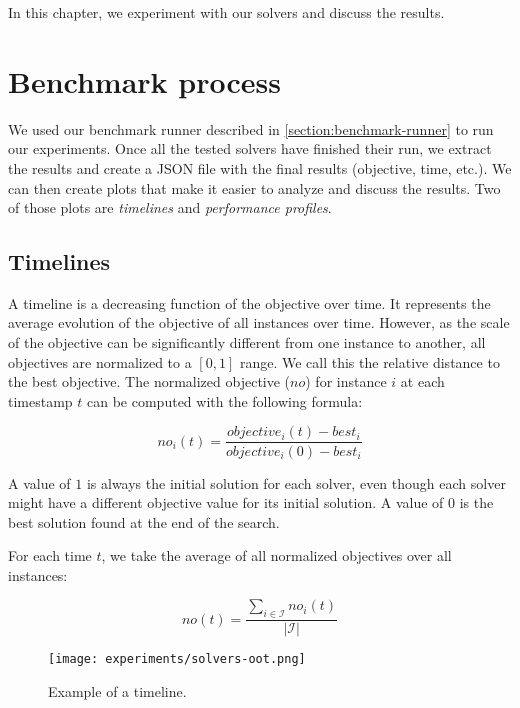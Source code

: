 \documentclass[../../thesis.tex]{subfiles}
\begin{document}
In this chapter, we experiment with our solvers and discuss the results. 

\section{Benchmark process}

We used our benchmark runner described in \autoref{section:benchmark-runner} to run our experiments.
Once all the tested solvers have finished their run, we extract the results and create a JSON file 
with the final results (objective, time, etc.). We can then create plots that make it 
easier to analyze and discuss the results. Two of those plots are \emph{timelines} and \emph{performance profiles}.

\subsection{Timelines}

A timeline is a decreasing function of the objective over time. 
It represents the average evolution of the objective of all instances over time.
However, as the scale of the objective can be 
significantly different from one instance to another, all objectives are normalized to a $[0, 1]$ range.
We call this the relative distance to the best objective. 
The normalized objective ($no$) for instance $i$ at each timestamp $t$ can 
be computed with the following formula:

\begin{equation*}
  no_i(t) = \frac{objective_i(t) - best_i}{objective_i(0) - best_i}
\end{equation*}

A value of $1$ is always the initial solution for each solver, even though each solver might have a different objective value for its initial solution.
A value of $0$ is the best solution found at the end of the search. 

For each time $t$, we take the average of all normalized objectives over all instances:


\begin{equation*}
   no(t) = \frac{\sum_{i \in \mathcal{I}} no_{i}(t)}{|\mathcal{I}|}
\end{equation*}



\begin{figure}
  \centering
  \texttt{[image: experiments/solvers-oot.png]}
  \caption{Example of a timeline.}
  \label{timeline-example}
\end{figure}
\end{document}
